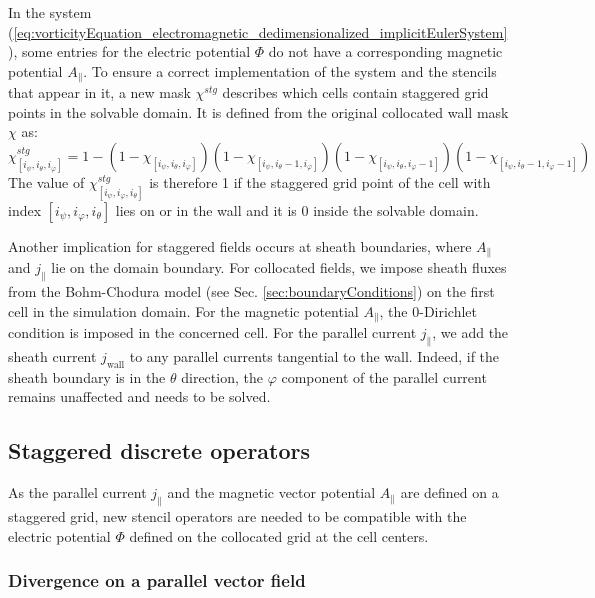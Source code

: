 In the system (\ref{eq:vorticityEquation_electromagnetic_dedimensionalized_implicitEulerSystem}), some entries for the electric potential $\Phi$ do not have a corresponding magnetic potential $A_\parallel$. To ensure a correct implementation of the system and the stencils that appear in it, a new mask $\chi^{stg}$ describes which cells contain staggered grid points in the solvable domain. It is defined from the original collocated wall mask $\chi$ as: 
\begin{equation}
	\label{eq:def_chi_staggered}
	\chi^{stg}_{[i_\psi,i_\theta, i_\varphi]} = 1 - (1 - \chi_{[i_\psi,i_\theta  ,i_\varphi  ]})
	(1 - \chi_{[i_\psi,i_\theta-1,i_\varphi  ]})
	(1 - \chi_{[i_\psi,i_\theta  ,i_\varphi-1]})
	(1 - \chi_{[i_\psi,i_\theta-1,i_\varphi-1]})
\end{equation}
The value of $\chi^{stg}_{[i_\psi,i_\varphi,i_\theta]}$ is therefore 1 if the staggered grid point of the cell with index $[i_\psi,i_\varphi,i_\theta]$ lies on or in the wall and it is 0 inside the solvable domain.



Another implication for staggered fields occurs at sheath boundaries, where $A_\parallel$ and $j_\parallel$ lie on the domain boundary. For collocated fields, we impose sheath fluxes from the Bohm-Chodura model (see Sec. \ref{sec:boundaryConditions}) on the first cell in the simulation domain. For the magnetic potential $A_\parallel$, the 0-Dirichlet condition is imposed in the concerned cell. For the parallel current $j_\parallel$, we add the sheath current $j_{\text{wall}}$ to any parallel currents tangential to the wall. Indeed, if the sheath boundary is in the $\theta$ direction, the $\varphi$ component of the parallel current remains unaffected and needs to be solved. 



\subsection{Staggered discrete operators}
As the parallel current $j_\parallel$ and the magnetic vector potential $A_\parallel$ are defined on a staggered grid, new stencil operators are needed to be compatible with the electric potential $\Phi$ defined on the collocated grid at the cell centers. 

\subsubsection{Divergence on a parallel vector field}

